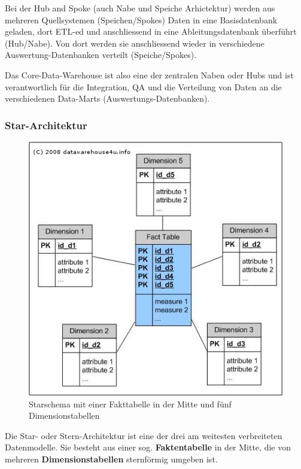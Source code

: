\documentclass[a4paper, 11pt]{article}
\begin{document}
Bei der Hub and Spoke (auch Nabe und Speiche Arhictektur) werden aus mehreren Quellsystemen (Speichen/Spokes) Daten in eine Basisdatenbank geladen, dort ETL-ed und anschliessend in eine Ableitungsdatenbank überführt (Hub/Nabe). Von dort werden sie anschliessend wieder in verschiedene Auswertung-Datenbanken verteilt (Speiche/Spokes).

\vspace{10px}

\noindent Das Core-Data-Warehouse ist also eine der zentralen Naben oder Hubs und ist verantwortlich für die Integration, QA und die Verteilung von Daten an die verschiedenen Data-Marts (Auswertungs-Datenbanken). 

\vspace{80px}


\subsubsection{Star-Architektur}

\begin{figure}
	\centering
	\includegraphics[keepaspectratio=true,height=16\baselineskip]{starschema.jpg}
	\caption{Starschema mit einer Fakttabelle in der Mitte und fünf Dimensionstabellen}
	\label{fig:star}
\end{figure}

Die Star- oder Stern-Architektur ist eine der drei am weitesten verbreiteten Datenmodelle. Sie besteht aus einer sog. \textbf{Faktentabelle} in der Mitte, die von mehreren \textbf{Dimensionstabellen} sternförmig umgeben ist. 
\end{document}
